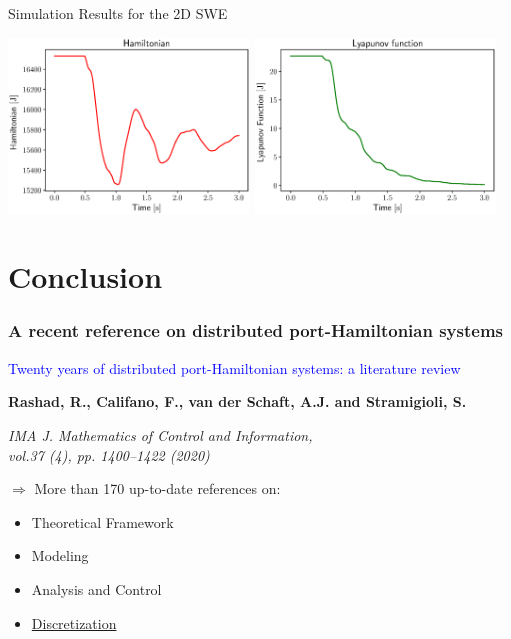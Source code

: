 \documentclass[10pt,aspectratio=43]{ISAE-Beamer}
\newcommand{\blue}[1]{\textcolor{blue}{#1}}
\begin{document}
\begin{frame}{Simulation Results for the 2D SWE}
\begin{center}
	\includegraphics[width=0.48\textwidth]{HamiltonianSW.eps}
	\includegraphics[width=0.48\textwidth]{LyapunovSW.eps}
\end{center}
\end{frame} 


\section{Conclusion}

\begin{frame}
	\frametitle{\small A recent reference on distributed port-Hamiltonian systems}
	\blue{Twenty years of distributed port-Hamiltonian systems: a literature review}
	
	\textbf{\quad Rashad, R.,  Califano, F.,  van der Schaft, A.J. and Stramigioli, S.}
	
	\quad \textit{IMA J. Mathematics of Control and Information, \\
		\quad vol.37 (4), pp. 1400--1422 (2020)}
	
	\vspace{5mm}
	
	$\Longrightarrow$ More than 170 up-to-date references on:
	\begin{itemize}
		\item Theoretical Framework
		\item Modeling
		\item Analysis and Control
		\item \underline{Discretization}
	\end{itemize}
\end{frame}
\end{document}
